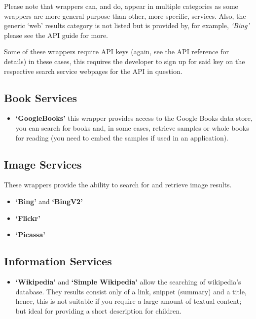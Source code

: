 \documentclass[letterpaper,10pt,english]{sphinxmanual}
\begin{document}
Please note that wrappers can, and do, appear in multiple categories as some wrappers are more general purpose than other, more specific, services. Also, the generic `web' results category is not listed but is provided by, for example, \emph{`Bing'} please see the API guide for more.

Some of these wrappers require API keys (again, see the API reference for details) in these cases, this requires the developer to sign up for said key on the respective search service webpages for the API in question.


\subsection{Book Services}
\label{wrappers:book-services}\begin{itemize}
\item {} 
\textbf{`GoogleBooks'} this wrapper provides access to the Google Books data store, you can search for books and, in some cases, retrieve samples or whole books for reading (you need to embed the samples if used in an application).

\end{itemize}


\subsection{Image Services}
\label{wrappers:image-services}
These wrappers provide the ability to search for and retrieve image results.
\begin{itemize}
\item {} 
\textbf{`Bing'} and \textbf{`BingV2'}

\item {} 
\textbf{`Flickr'}

\item {} 
\textbf{`Picassa'}

\end{itemize}


\subsection{Information Services}
\label{wrappers:information-services}\begin{itemize}
\item {} 
\textbf{`Wikipedia'} and \textbf{`Simple Wikipedia'} allow the searching of wikipedia's database. They results consist only of a link, snippet (summary) and a title, hence, this is not suitable if you require a large amount of textual content; but ideal for providing a short description for children.

\end{itemize}
\end{document}

